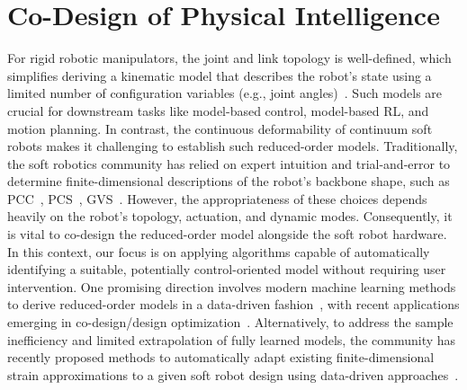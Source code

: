 \section{Co-Design of Physical Intelligence}\label{sec:apx:holisticcodesign:codesigning_physical_intelligence}
For rigid robotic manipulators, the joint and link topology is well-defined, which simplifies deriving a kinematic model that describes the robot’s state using a limited number of configuration variables (e.g., joint angles)~\citep{siciliano2010robotics, zhao2020robogrammar}. Such models are crucial for downstream tasks like model-based control, model-based RL, and motion planning. In contrast, the continuous deformability of continuum soft robots makes it challenging to establish such reduced-order models. Traditionally, the soft robotics community has relied on expert intuition and trial-and-error to determine finite-dimensional descriptions of the robot’s backbone shape, such as \gls{PCC}~\citep{webster2010design}, \gls{PCS}~\citep{renda2018discrete}, \gls{GVS}~\citep{renda2020geometric}. However, the appropriateness of these choices depends heavily on the robot’s topology, actuation, and dynamic modes. Consequently, it is vital to co-design the reduced-order model alongside the soft robot hardware. In this context, our focus is on applying algorithms capable of automatically identifying a suitable, potentially control-oriented model without requiring user intervention. One promising direction involves modern machine learning methods to derive reduced-order models in a data-driven fashion~\citep{thuruthel2017learning, bern2020soft, alora2023data, chen2024data, menager2023direct}, with recent applications emerging in co-design/design optimization~\citep{navez2024contributions}. Alternatively, to address the sample inefficiency and limited extrapolation of fully learned models, the community has recently proposed methods to automatically adapt existing finite-dimensional strain approximations to a given soft robot design using data-driven approaches~\citep{alkayas2025soft, valadas2025learning, navez2025modeling}.

